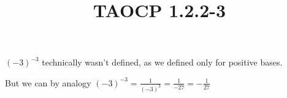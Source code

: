 \documentclass{article}
\title{TAOCP 1.2.2\mbox{-}3}
\begin{document}
\maketitle

\( {(-3)}^{-3} \) technically wasn't defined, as we defined only for positive bases.

But we can by analogy \( {(-3)}^{-3} = \frac{1}{{(-3)}^{3}} = \frac{1}{-27} = -\frac{1}{27} \)
\end{document}
